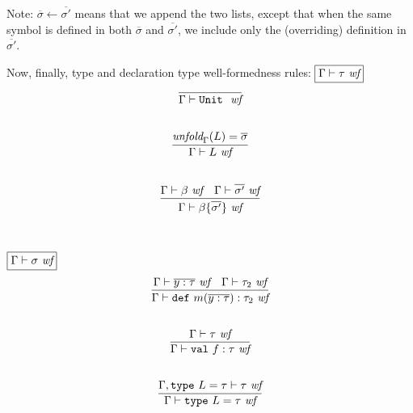\documentclass{article}
\newcommand{\keywadj}[1]{\mathtt{#1}}
\newcommand{\keyw}[1]{\keywadj{#1}~}
\begin{document}
Note: $\overline{\sigma} \leftarrow \overline{\sigma'}$ means that we append the two lists, except that when the same symbol is defined in both $\overline{\sigma}$ and $\overline{\sigma'}$, we include only the (overriding) definition in $\overline{\sigma'}$.

Now, finally, type and declaration type well-formedness rules:
$\fbox{$\Gamma \vdash \tau~\textit{wf}$}$
\[
\begin{array}{c}
\infer
  {\Gamma \vdash \keyw{Unit}~\textit{wf}}
  {}\\[5ex]

\infer
  {\Gamma \vdash L~\textit{wf}}
  {\textit{unfold}_\Gamma(L) = \overline{\sigma}}\\[5ex]

\infer
  {\Gamma \vdash \beta \{\overline{\sigma'}\}~\textit{wf}}
  {\Gamma \vdash \beta ~\textit{wf} & \Gamma \vdash \overline{\sigma'}~\textit{wf}}\\[5ex]

\end{array}
\]

$\fbox{$\Gamma \vdash \sigma~\textit{wf}$}$
\[
\begin{array}{c}
\infer
  {\Gamma \vdash \keyw{def} m(\overline{y : \tau}) : \tau_2~\textit{wf}}
  {\Gamma \vdash \overline{y : \tau}~\textit{wf} & \Gamma \vdash \tau_2~\textit{wf}}\\[5ex]

\infer
  {\Gamma \vdash \keyw{val} f : \tau~\textit{wf}}
  {\Gamma \vdash \tau~\textit{wf}}\\[5ex]

\infer
  {\Gamma \vdash \keyw{type} L = \tau~\textit{wf}}
  {\Gamma, \keyw{type} L = \tau \vdash \tau~\textit{wf}}\\[5ex]


\end{array}
\]



\end{document}
